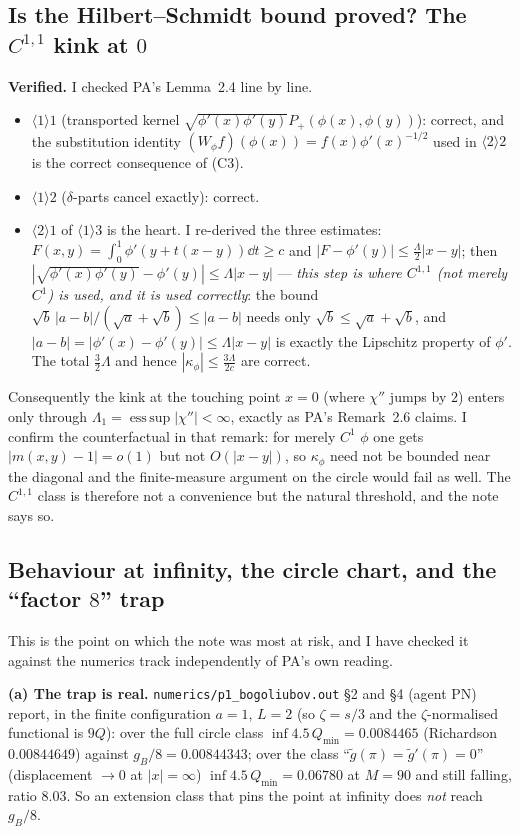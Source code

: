 \documentclass[11pt]{article}
\newcommand{\Pp}{P_+}\newcommand{\Pm}{P_-}
\begin{document}
\subsection{Is the Hilbert--Schmidt bound proved?  The $C^{1,1}$ kink at $0$}
\textbf{Verified.}  I checked PA's Lemma~2.4 line by line.
\begin{itemize}[leftmargin=1.4em]
\item $\langle1\rangle1$ (transported kernel $\sqrt{\phi'(x)\phi'(y)}\Pp(\phi(x),\phi(y))$): correct,
 and the substitution identity $(W_\phi f)(\phi(x))=f(x)\phi'(x)^{-1/2}$ used in $\langle2\rangle2$ is
 the correct consequence of (C3).
\item $\langle1\rangle2$ ($\delta$-parts cancel exactly): correct.
\item $\langle2\rangle1$ of $\langle1\rangle3$ is the heart.  I re-derived the three estimates:
 $F(x,y)=\int_0^1\phi'(y+t(x-y))\dd t\ge c$ and $|F-\phi'(y)|\le\frac\Lambda2|x-y|$; then
 $|\sqrt{\phi'(x)\phi'(y)}-\phi'(y)|\le\Lambda|x-y|$ --- \emph{this step is where $C^{1,1}$
 (not merely $C^1$) is used, and it is used correctly}: the bound
 $\sqrt{b}\,|a-b|/(\sqrt a+\sqrt b)\le|a-b|$ needs only $\sqrt b\le\sqrt a+\sqrt b$, and
 $|a-b|=|\phi'(x)-\phi'(y)|\le\Lambda|x-y|$ is exactly the Lipschitz property of $\phi'$.
 The total $\frac32\Lambda$ and hence $|\kappa_\phi|\le\frac{3\Lambda}{2c}$ are correct.
\end{itemize}
Consequently the kink at the touching point $x=0$ (where $\chi''$ jumps by $2$) enters only through
$\Lambda_1=\operatorname{ess\,sup}|\chi''|<\infty$, exactly as PA's Remark~2.6 claims.  I confirm the
counterfactual in that remark: for merely $C^1$ $\phi$ one gets $|m(x,y)-1|=o(1)$ but not
$O(|x-y|)$, so $\kappa_\phi$ need not be bounded near the diagonal and the finite-measure argument on
the circle would fail as well.  The $C^{1,1}$ class is therefore not a convenience but the natural
threshold, and the note says so.

\subsection{Behaviour at infinity, the circle chart, and the ``factor $8$'' trap}\label{sec:i1inf}
This is the point on which the note was most at risk, and I have checked it against the numerics
track independently of PA's own reading.

\textbf{(a) The trap is real.}  \texttt{numerics/p1\_bogoliubov.out} \S2 and \S4 (agent PN) report, in
the finite configuration $a=1$, $L=2$ (so $\zeta=s/3$ and the $\zeta$-normalised functional is
$9Q$): over the full circle class $\inf 4.5\,Q_{\min}=0.0084465$ (Richardson $0.00844649$) against
$g_B/8=0.00844343$; over the class ``$\widetilde g(\pi)=\widetilde g'(\pi)=0$'' (displacement
$\to0$ at $|x|=\infty$) $\inf 4.5\,Q_{\min}=0.06780$ at $M=90$ and still falling, ratio $8.03$.  So
an extension class that pins the point at infinity does \emph{not} reach $g_B/8$.
\end{document}
